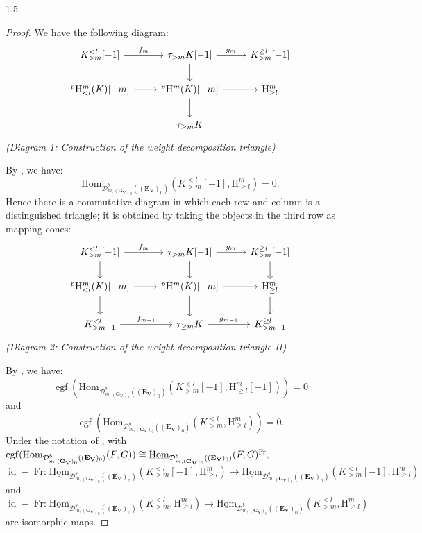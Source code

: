 \documentclass[10pt]{amsart}
\def\Hom{\mbox{\rm Hom}}  \def\ap{\mbox{\rm ap}}
\begin{document}
\begin{spacing}{1.5}
\begin{proof}
We have the following diagram:
\[
\begin{tikzcd}
K_{>m}^{<l}[-1] \arrow[r, "f_m"] & \tau_{>m}K[-1] \arrow[r, "g_m"] \arrow[d] & K_{>m}^{\geq l}[-1] \\
^{p}\mathrm{H}^m_{<l}(K)[-m] \arrow[r] & ^{p}\mathrm{H}^m(K)[-m] \arrow[d] \arrow[r] & \mathrm{H}^m_{\geq l} \\
& \tau_{\geq m}K &
\end{tikzcd}
\]
\emph{(Diagram 1: Construction of the weight decomposition triangle)}

By \cite[Lemma 5.4.14(3)]{Pramod-2021}, we have:
\[
\mathrm{Hom}_{\mathcal{D}^b_{m,(\mathbf{G}_{\mathbf{V}})_0}((\mathbf{E}_{\mathbf{V}})_0)}(K_{>m}^{<l}[-1],\mathrm{H}^m_{\geq l})=0.
\]
Hence there is a commutative diagram in which each row and column is a distinguished triangle; it is obtained by taking the objects in the third row as mapping cones:
\[
\begin{tikzcd}
K_{>m}^{<l}[-1] \arrow[r, "f_m"] \arrow[d] & \tau_{>m}K[-1] \arrow[r, "g_m"] \arrow[d] & K_{>m}^{\geq l}[-1] \arrow[d] \\
^{p}\mathrm{H}^m_{<l}(K)[-m] \arrow[r] \arrow[d] & ^{p}\mathrm{H}^m(K)[-m] \arrow[d] \arrow[r] & \mathrm{H}^m_{\geq l} \arrow[d] \\
K_{>m-1}^{<l} \arrow[r, "f_{m-1}"] & \tau_{\geq m}K \arrow[r, "g_{m-1}"] & K_{>m-1}^{\geq l}
\end{tikzcd}
\]
\emph{(Diagram 2: Construction of the weight decomposition triangle II)}

By \cite[Lemma 5.4.14(1)]{Pramod-2021}, we have:
\[
\operatorname{egf}\left(\mathrm{Hom}_{\mathcal{D}^b_{m,(\mathbf{G}_{\mathbf{V}})_0}((\mathbf{E}_{\mathbf{V}})_0)}(K_{>m}^{<l}[-1],\mathrm{H}^m_{\geq l}[-1])\right)=0
\]
and
\[
\operatorname{egf}\left(\mathrm{Hom}_{\mathcal{D}^b_{m,(\mathbf{G}_{\mathbf{V}})_0}((\mathbf{E}_{\mathbf{V}})_0)}(K_{>m}^{<l},\mathrm{H}^m_{\geq l})\right)=0.
\]
Under the notation of \cite[Remark 5.3.5]{Pramod-2021}, with $\operatorname{egf}(\Hom_{\mathcal{D}^b_{m,(\mathbf{G}_{\mathbf{V}})_0}((\mathbf{E}_{\mathbf{V}})_0)}(F,G))\cong \underline{\Hom}_{\mathcal{D}^b_{m,(\mathbf{G}_{\mathbf{V}})_0}((\mathbf{E}_{\mathbf{V}})_0)}(F,G)^{\operatorname{Fr}},$ $$\operatorname{id}-\operatorname{Fr:}\underline{\mathrm{Hom}}_{\mathcal{D}^b_{m,(\mathbf{G}_{\mathbf{V}})_0}((\mathbf{E}_{\mathbf{V}})_0)}(K_{>m}^{<l}[-1],\mathrm{H}^m_{\geq l})\rightarrow\underline{\mathrm{Hom}}_{\mathcal{D}^b_{m,(\mathbf{G}_{\mathbf{V}})_0}((\mathbf{E}_{\mathbf{V}})_0)}(K_{>m}^{<l}[-1],\mathrm{H}^m_{\geq l})$$ and $$\operatorname{id}-\operatorname{Fr:}\underline{\mathrm{Hom}}_{\mathcal{D}^b_{m,(\mathbf{G}_{\mathbf{V}})_0}((\mathbf{E}_{\mathbf{V}})_0)}(K_{>m}^{<l},\mathrm{H}^m_{\geq l})\rightarrow\underline{\mathrm{Hom}}_{\mathcal{D}^b_{m,(\mathbf{G}_{\mathbf{V}})_0}((\mathbf{E}_{\mathbf{V}})_0)}(K_{>m}^{<l},\mathrm{H}^m_{\geq l})$$ are isomorphic maps.


\end{proof}
\end{spacing}
\end{document}
